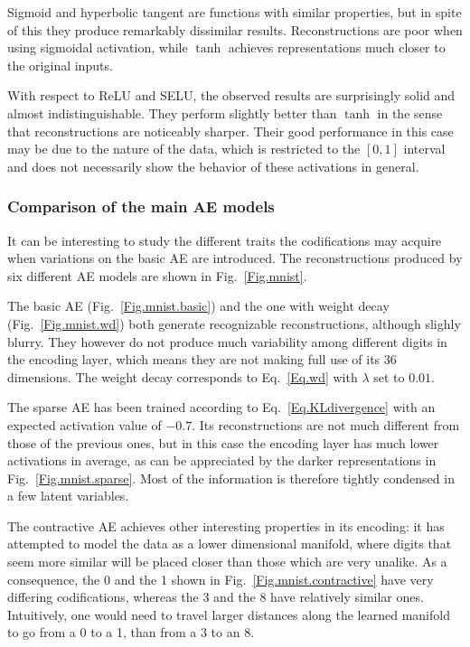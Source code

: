 Sigmoid and hyperbolic tangent are functions with similar properties, but in spite of this they produce remarkably dissimilar results. Reconstructions are poor when using sigmoidal activation, while $\tanh$ achieves representations much closer to the original inputs.

With respect to ReLU and SELU, the observed results are surprisingly solid and almost indistinguishable. They perform slightly better than $\tanh$ in the sense that reconstructions are noticeably sharper. Their good performance in this case may be due to the nature of the data, which is restricted to the $[0,1]$ interval and does not necessarily show the behavior of these activations in general.


\subsubsection{Comparison of the main AE models}\label{Sec.case.models}

It can be interesting to study the different traits the codifications may acquire when variations on the basic AE are introduced. The reconstructions produced by six different AE models are shown in Fig.~\ref{Fig.mnist}. 

The basic AE (Fig.~\ref{Fig.mnist.basic}) and the one with weight decay (Fig.~\ref{Fig.mnist.wd}) both generate recognizable reconstructions, although slighly blurry. They however do not produce much variability among different digits in the encoding layer, which means they are not making full use of its 36 dimensions. The weight decay corresponds to Eq.~\ref{Eq.wd} with $\lambda$ set to $0.01$.

The sparse AE has been trained according to Eq.~\ref{Eq.KLdivergence} with an expected activation value of $-0.7$. Its reconstructions are not much different from those of the previous ones, but in this case the encoding layer has much lower activations in average, as can be appreciated by the darker representations in  Fig.~\ref{Fig.mnist.sparse}. Most of the information is therefore tightly condensed in a few latent variables.

The contractive AE achieves other interesting properties in its encoding: it has attempted to model the data as a lower dimensional manifold, where digits that seem more similar will be placed closer than those which are very unalike. As a consequence, the 0 and the 1 shown in Fig.~\ref{Fig.mnist.contractive} have very differing codifications, whereas the 3 and the 8 have relatively similar ones. Intuitively, one would need to travel larger distances along the learned manifold to go from a 0 to a 1, than from a 3 to an 8.

